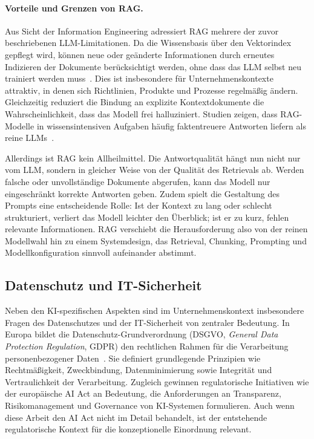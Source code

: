 \paragraph{Vorteile und Grenzen von RAG.}

Aus Sicht der Information Engineering adressiert RAG mehrere der zuvor beschriebenen LLM-Limitationen.
Da die Wissensbasis über den Vektorindex gepflegt wird, können neue oder geänderte Informationen durch erneutes Indizieren der Dokumente berücksichtigt werden, ohne dass das LLM selbst neu trainiert werden muss~\cite{lewis2020rag,gao2023retrieval}.
Dies ist insbesondere für Unternehmenskontexte attraktiv, in denen sich Richtlinien, Produkte und Prozesse regelmäßig ändern.
Gleichzeitig reduziert die Bindung an explizite Kontextdokumente die Wahrscheinlichkeit, dass das Modell frei halluziniert.
Studien zeigen, dass RAG-Modelle in wissensintensiven Aufgaben häufig faktentreuere Antworten liefern als reine LLMs~\cite{lewis2020rag,ji2023hallucination}.

Allerdings ist RAG kein Allheilmittel.
Die Antwortqualität hängt nun nicht nur vom LLM, sondern in gleicher Weise von der Qualität des Retrievals ab.
Werden falsche oder unvollständige Dokumente abgerufen, kann das Modell nur eingeschränkt korrekte Antworten geben.
Zudem spielt die Gestaltung des Prompts eine entscheidende Rolle: Ist der Kontext zu lang oder schlecht strukturiert, verliert das Modell leichter den Überblick; ist er zu kurz, fehlen relevante Informationen.
RAG verschiebt die Herausforderung also von der reinen Modellwahl hin zu einem Systemdesign, das Retrieval, Chunking, Prompting und Modellkonfiguration sinnvoll aufeinander abstimmt.

\subsection{Datenschutz und IT-Sicherheit}
\label{subsec:grundlagen-datenschutz}

Neben den KI-spezifischen Aspekten sind im Unternehmenskontext insbesondere Fragen des Datenschutzes und der IT-Sicherheit von zentraler Bedeutung.
In Europa bildet die Datenschutz-Grundverordnung (DSGVO, \textit{General Data Protection Regulation}, GDPR) den rechtlichen Rahmen für die Verarbeitung personenbezogener Daten~\cite{gdpr2016}.
Sie definiert grundlegende Prinzipien wie Rechtmäßigkeit, Zweckbindung, Datenminimierung sowie Integrität und Vertraulichkeit der Verarbeitung.
Zugleich gewinnen regulatorische Initiativen wie der europäische AI Act an Bedeutung, die Anforderungen an Transparenz, Risikomanagement und Governance von KI-Systemen formulieren.
Auch wenn diese Arbeit den AI Act nicht im Detail behandelt, ist der entstehende regulatorische Kontext für die konzeptionelle Einordnung relevant.


